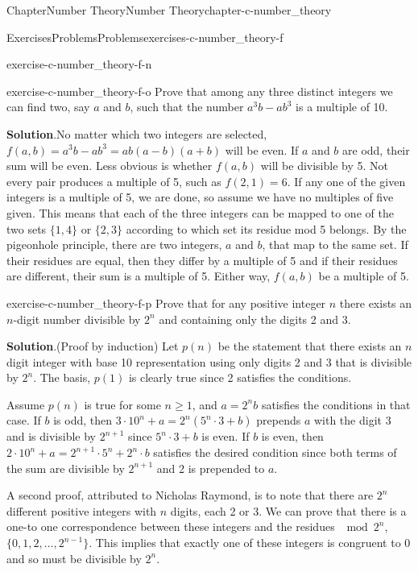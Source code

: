 \documentclass[oneside,10pt,]{book}
\newcommand{\blocktitlefont}{\relax}
\numberwithin{equation}{section}
\begin{document}
\begin{chapterptx}{Chapter}{Number Theory}{}{Number Theory}{}{}{chapter-c-number_theory}
\begin{exercises-section}{Exercises}{Problems}{}{Problems}{}{}{exercises-c-number_theory-f}
\begin{divisionexercise}{12}{}{}{exercise-c-number_theory-f-n}
\end{divisionexercise}%
\begin{divisionexercise}{13}{}{}{exercise-c-number_theory-f-o}%
Prove that among any three distinct integers we can find two, say \(a\) and \(b\), such that the number \(a^3b - a b^3\) is a multiple of 10.%
\par\smallskip%
\noindent\textbf{\blocktitlefont Solution}.\hypertarget{solution-c-number_theory-f-o-b}{}\quad{}No matter which two integers are selected, \(f(a,b)=a^3b - a b^3=a b (a-b)(a+b)\) will be even.  If \(a\) and \(b\) are odd, their sum will be even. Less obvious is whether  \(f(a,b)\) will be divisible by 5. Not every pair produces a multiple of 5, such as \(f(2,1)=6\).  If any one of the given integers is a multiple of 5, we are done, so assume we have no multiples of five given.  This means that each of the three integers can be mapped to one of the two sets \(\{1,4\}\) or \(\{2,3\}\) according to which set its residue mod 5 belongs.   By the pigeonhole principle, there are two integers, \(a\) and \(b\), that map to the same set.  If their residues are equal, then they differ by a multiple of 5 and if their residues are different, their sum is a multiple of 5.  Either way, \(f(a,b)\) be a multiple of 5.%
\end{divisionexercise}%
\begin{divisionexercise}{14}{}{}{exercise-c-number_theory-f-p}%
Prove that for any positive integer \(n\) there exists an \(n\)-digit number divisible by \(2^n\) and containing only the digits 2 and 3.%
\par\smallskip%
\noindent\textbf{\blocktitlefont Solution}.\hypertarget{solution-c-number_theory-f-p-b}{}\quad{}(Proof by induction) Let \(p(n)\) be the statement that there exists an \(n\) digit integer with base 10 representation using only digits 2 and 3 that is divisible by \(2^n\).  The basis, \(p(1)\) is clearly true since 2 satisfies the conditions.%
\par
Assume \(p(n)\) is true for some \(n \ge 1\), and \(a=2^n b\) satisfies the conditions in that case.  If \(b\) is odd, then \(3\cdot 10^n + a = 2^n(5^n\cdot 3 + b)\) prepends \(a\) with the digit 3 and is divisible by \(2^{n+1}\) since \(5^n\cdot 3 + b\) is even.  If \(b\) is even, then \(2\cdot 10^n + a = 2^{n+1}\cdot 5^n + 2^n\cdot b\) satisfies the desired condition since both terms of the sum are divisible by \(2^{n+1}\) and 2 is prepended to \(a\).%
\par
A second proof, attributed to Nicholas Raymond, is to note that there are \(2^n\) different positive integers with \(n\) digits, each 2 or 3.  We can prove that there is a one-to one correspondence between these integers and the residues \(\mod{2^n}\), \(\{ 0, 1, 2, \dots, 2^{n-1} \}\).  This implies that exactly one of these integers is congruent to 0 and so must be divisible by \(2^n\).%

\end{divisionexercise}
\end{exercises-section}
\end{chapterptx}
\end{document}
